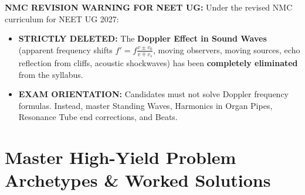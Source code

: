 \documentclass[10pt,twoside,openright]{book}
\begin{document}
\begin{trapbox}
\textbf{NMC REVISION WARNING FOR NEET UG:}
Under the revised NMC curriculum for NEET UG 2027:
\begin{itemize}
  \item \textbf{STRICTLY DELETED:} The \textbf{Doppler Effect in Sound Waves} (apparent frequency shifts $f' = f\frac{v \pm v_0}{v \mp v_s}$, moving observers, moving sources, echo reflection from cliffs, acoustic shockwaves) has been \textbf{completely eliminated} from the syllabus.
  \item \textbf{EXAM ORIENTATION:} Candidates must not solve Doppler frequency formulas. Instead, master Standing Waves, Harmonics in Organ Pipes, Resonance Tube end corrections, and Beats.
\end{itemize}
\end{trapbox}

\section{Master High-Yield Problem Archetypes \& Worked Solutions}
\end{document}
